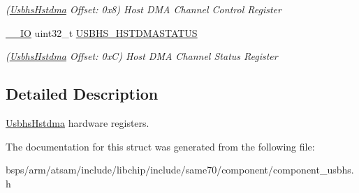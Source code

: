 \begin{DoxyCompactItemize}
\begin{DoxyCompactList}\small\item\em (\mbox{\hyperlink{structUsbhsHstdma}{Usbhs\+Hstdma}} Offset\+: 0x8) Host D\+MA Channel Control Register \end{DoxyCompactList}\item 
\mbox{\label{structUsbhsHstdma_a396406c35076a3ceb7a883c8ef1b17c9}} 
\mbox{\hyperlink{core__cm7_8h_aec43007d9998a0a0e01faede4133d6be}{\+\_\+\+\_\+\+IO}} uint32\+\_\+t \mbox{\hyperlink{structUsbhsHstdma_a396406c35076a3ceb7a883c8ef1b17c9}{U\+S\+B\+H\+S\+\_\+\+H\+S\+T\+D\+M\+A\+S\+T\+A\+T\+US}}
\begin{DoxyCompactList}\small\item\em (\mbox{\hyperlink{structUsbhsHstdma}{Usbhs\+Hstdma}} Offset\+: 0xC) Host D\+MA Channel Status Register \end{DoxyCompactList}\end{DoxyCompactItemize}


\subsection{Detailed Description}
\mbox{\hyperlink{structUsbhsHstdma}{Usbhs\+Hstdma}} hardware registers. 

The documentation for this struct was generated from the following file\+:\begin{DoxyCompactItemize}
\item 
bsps/arm/atsam/include/libchip/include/same70/component/component\+\_\+usbhs.\+h\end{DoxyCompactItemize}
